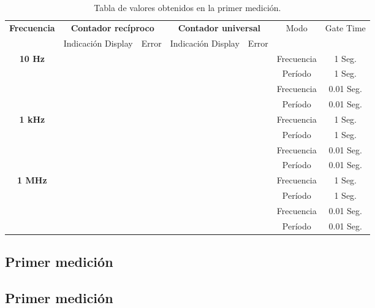 \documentclass{article}
\begin{document}
\newpage
\begin{table}[!hbt]
	\begin{center}

		\begin{tabular}{|c|c|c|c|c|c|c|} \hline
			\multirow{2}{*}{\textbf{Frecuencia}}
			& \multicolumn{2}{c|}{\textbf{Contador recíproco}} & \multicolumn{2}{c|}{\textbf{Contador universal}} & \multirow{2}{*}{Modo} & \multirow{2}{*}{Gate Time} \\\cline{2-5}
			& Indicación Display & Error & Indicación Display & Error \\\hline
			
			\multirow{4}{*}{\textbf{10 Hz}}
			&  &  &  &  & Frecuencia & 1 Seg. \\\cline{2-7}
			&  &  &  &  & Período & 1 Seg. \\\cline{2-7}
			&  &  &  &  & Frecuencia & 0.01 Seg. \\\cline{2-7}
			&  &  &  &  & Período & 0.01 Seg. \\\hline

			\multirow{4}{*}{\textbf{1 kHz}}
			&  &  &  &  & Frecuencia & 1 Seg. \\\cline{2-7}
			&  &  &  &  & Período & 1 Seg. \\\cline{2-7}
			&  &  &  &  & Frecuencia & 0.01 Seg. \\\cline{2-7}
			&  &  &  &  & Período & 0.01 Seg. \\\hline

			\multirow{4}{*}{\textbf{1 MHz}}
			&  &  &  &  & Frecuencia & 1 Seg. \\\cline{2-7}
			&  &  &  &  & Período & 1 Seg. \\\cline{2-7}
			&  &  &  &  & Frecuencia & 0.01 Seg. \\\cline{2-7}
			&  &  &  &  & Período & 0.01 Seg. \\\hline
		\end{tabular}

	\caption{Tabla de valores obtenidos en la primer medición.}
	\end{center}
\end{table}
\medskip


\subsection{Primer medición}


\subsection{Primer medición}
\end{document}
